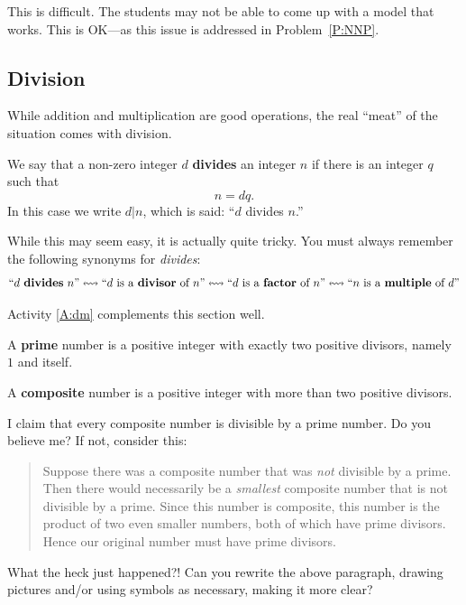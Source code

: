 \begin{teachingnote}
This is difficult. The students may not be able to come up with a
model that works. This is OK---as this issue is addressed in
Problem~\ref{P:NNP}.
\end{teachingnote}


\subsection{Division} 

While addition and multiplication are good operations, the real
``meat'' of the situation comes with division.

\begin{definition}    %
We say that a non-zero integer $d$ \textbf{divides} an integer $n$ if there is
an integer $q$ such that 
\[
n = dq.
\]
In this case we write $d | n$, which is said: ``$d$ divides $n$.'' 
\end{definition}

While this may seem easy, it is actually quite tricky. You must always
remember the following synonyms for \textit{divides}:
\[\index{multiple}\index{factor}
\text{``$d$ \textbf{divides} $n$''}\leftrightsquigarrow 
\text{``$d$ is a \textbf{divisor} of $n$''}\leftrightsquigarrow
\text{``$d$ is  a \textbf{factor} of $n$''}\leftrightsquigarrow 
\text{``$n$ is a  \textbf{multiple} of $d$''}
\]

\begin{activitynote}
Activity \ref{A:dm} complements this section well.  %
\end{activitynote}

\begin{definition} 
A \textbf{prime} number is a positive integer with exactly two
positive divisors, namely $1$ and itself.
\end{definition}

\begin{definition} 
A \textbf{composite} number is a positive integer with more than two
positive divisors.
\end{definition}

I claim that every composite number is divisible by a prime number. Do
you believe me? If not, consider this:
\begin{quote}
Suppose there was a composite number that was \textit{not} divisible
by a prime. Then there would necessarily be a \textit{smallest}
composite number that is not divisible by a prime. Since this number
is composite, this number is the product of two even smaller numbers,
both of which have prime divisors. Hence our original number must have
prime divisors.
\end{quote}
\begin{question} 
What the heck just happened?! Can you rewrite the above paragraph,
drawing pictures and/or using symbols as necessary, making it more
clear?
\end{question}
\QM


